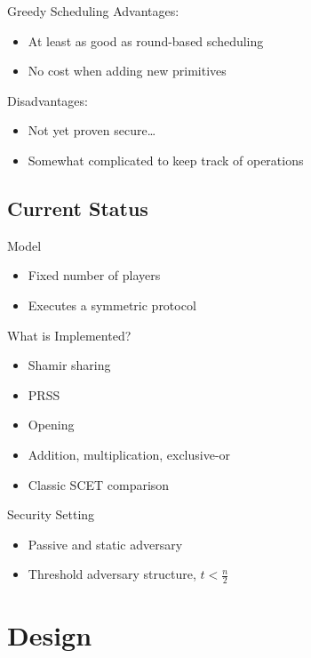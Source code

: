 \documentclass[t,noamsthm]{beamer}
\begin{document}
\begin{frame}{Greedy Scheduling}
  Advantages:
  \begin{itemize}
  \item At least as good as round-based scheduling
  \item No cost when adding new primitives
  \end{itemize}

  Disadvantages:
  \begin{itemize}
  \item Not yet proven secure\dots
  \item Somewhat complicated to keep track of operations
  \end{itemize}
\end{frame}


\subsection{Current Status}

\begin{frame}{Model}
  \begin{itemize}
  \item Fixed number of players
  \item Executes a symmetric protocol
  \end{itemize}
\end{frame}

\begin{frame}{What is Implemented?}
  \begin{itemize}
  \item Shamir sharing
  \item PRSS
  \item Opening
  \item Addition, multiplication, exclusive-or
  \item Classic SCET comparison
  \end{itemize}
\end{frame}

\begin{frame}{Security Setting}
  \begin{itemize}
  \item Passive and static adversary
  \item Threshold adversary structure, $t < \frac n 2$
  \end{itemize}
\end{frame}


\section{Design}
\end{document}
